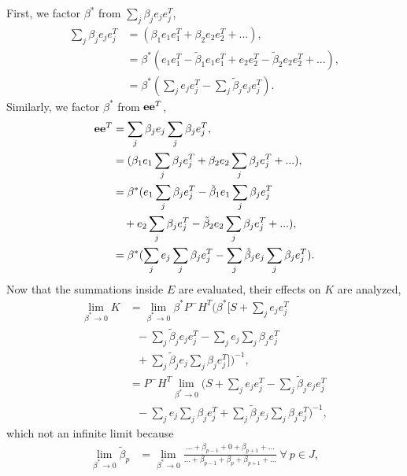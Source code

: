 \documentclass[letterpaper, 10pt, conference]{ieeeconf}
\begin{document}
\begin{appendix}
First, we factor $\beta^*$ from $\sum\limits_{j} \beta_{j}e_{j}e_{j}^T$,
\begin{align}
\sum\limits_{j} \beta_{j}e_{j}e_{j}^T&=(\beta_1e_1e_1^T+\beta_2e_2e_2^T+...),\nonumber
\\
&=\beta^*
(e_1e_1^T-\tilde\beta_1e_1e_1^T+
e_2e_2^T-\tilde\beta_2e_2e_2^T+...),\nonumber
\\
&=\beta^*(\sum\limits_{j}e_{j}e_{j}^T-\sum\limits_{j}\tilde\beta_je_{j}e_{j}^T).
\end{align}
Similarly, we factor $\beta^*$ from ${{\bf{e}}}{\bf{e}}^T$,
\begin{align}
{{\bf{e}}}{\bf{e}}^T&=\sum\limits_{j} \beta_{j}e_{j}\sum\limits_{j} \beta_{j}e_{j}^T,\nonumber
\\
&=
(\beta_1e_1\sum\limits_{j} \beta_{j}e_{j}^T+\beta_2e_2\sum\limits_{j} \beta_{j}e_{j}^T+...),\nonumber
\\
&=\beta^*(e_1\sum\limits_{j} \beta_{j}e_{j}^T-\tilde\beta_1e_1\sum\limits_{j} \beta_{j}e_{j}^T\nonumber
\\
&\ \ \ +e_2\sum\limits_{j} \beta_{j}e_{j}^T-\tilde\beta_2e_2\sum\limits_{j} \beta_{j}e_{j}^T+...),\nonumber
\\
&=\beta^*(\sum\limits_{j}e_{j}\sum\limits_{j}\beta_je_{j}^T-\sum\limits_{j}\tilde\beta_je_{j}\sum\limits_{j}\beta_je_{j}^T).
\end{align}
Now that the summations inside $E$ are evaluated, their effects on $K$ are analyzed,
\begin{align}
\lim_{\beta^* \to 0}K&=\lim_{\beta^* \to 0}\beta^*P^-H^T
(\beta^*[S+\sum\limits_{j}e_{j}e_{j}^T\nonumber
\\
&\ \ \ -\sum\limits_{j}\tilde\beta_je_{j}e_{j}^T
-\sum\limits_{j}e_{j}\sum\limits_{j}\beta_je_{j}^T\nonumber
\\
&\ \ \ +\sum\limits_{j}\tilde\beta_je_{j}\sum\limits_{j}\beta_je_{j}^T])^{-1},\nonumber
\\
&=P^-H^T\lim_{\beta^* \to 0}
(S+\sum\limits_{j}e_{j}e_{j}^T-\sum\limits_{j}\tilde\beta_je_{j}e_{j}^T\nonumber
\\
&\ \ \ -\sum\limits_{j}e_{j}\sum\limits_{j}\beta_je_{j}^T+\sum\limits_{j}\tilde\beta_je_{j}\sum\limits_{j}\beta_je_{j}^T)^{-1},
\label{eqn:OptGainNoSingularity}
\end{align}
which not an infinite limit because
\begin{align}
\lim_{\beta^* \to 0}\tilde\beta_p&=\lim_{\beta^* \to 0}\frac{...+\beta_{p-1}+0+\beta_{p+1}+...}{...+\beta_{p-1}+\beta_p+\beta_{p+1}+...}\ \forall\ p\in J,\nonumber
\\

\end{align}
\end{appendix}
\end{document}
